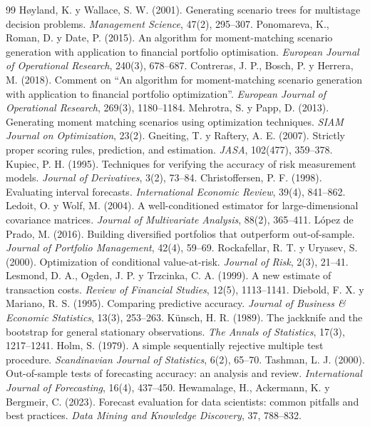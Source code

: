 \documentclass[11pt,letterpaper]{article}
\begin{document}
\small
\begin{thebibliography}{99}
 Høyland, K. y Wallace, S. W. (2001). Generating scenario trees for multistage decision problems. \textit{Management Science}, 47(2), 295--307.
 Ponomareva, K., Roman, D. y Date, P. (2015). An algorithm for moment-matching scenario generation with application to financial portfolio optimisation. \textit{European Journal of Operational Research}, 240(3), 678--687.
 Contreras, J. P., Bosch, P. y Herrera, M. (2018). Comment on ``An algorithm for moment-matching scenario generation with application to financial portfolio optimization''. \textit{European Journal of Operational Research}, 269(3), 1180--1184.
 Mehrotra, S. y Papp, D. (2013). Generating moment matching scenarios using optimization techniques. \textit{SIAM Journal on Optimization}, 23(2).
 Gneiting, T. y Raftery, A. E. (2007). Strictly proper scoring rules, prediction, and estimation. \textit{JASA}, 102(477), 359--378.
 Kupiec, P. H. (1995). Techniques for verifying the accuracy of risk measurement models. \textit{Journal of Derivatives}, 3(2), 73--84.
 Christoffersen, P. F. (1998). Evaluating interval forecasts. \textit{International Economic Review}, 39(4), 841--862.
 Ledoit, O. y Wolf, M. (2004). A well-conditioned estimator for large-dimensional covariance matrices. \textit{Journal of Multivariate Analysis}, 88(2), 365--411.
 López de Prado, M. (2016). Building diversified portfolios that outperform out-of-sample. \textit{Journal of Portfolio Management}, 42(4), 59--69.
 Rockafellar, R. T. y Uryasev, S. (2000). Optimization of conditional value-at-risk. \textit{Journal of Risk}, 2(3), 21--41.
 Lesmond, D. A., Ogden, J. P. y Trzcinka, C. A. (1999). A new estimate of transaction costs. \textit{Review of Financial Studies}, 12(5), 1113--1141.
 Diebold, F. X. y Mariano, R. S. (1995). Comparing predictive accuracy. \textit{Journal of Business \& Economic Statistics}, 13(3), 253--263.
 Künsch, H. R. (1989). The jackknife and the bootstrap for general stationary observations. \textit{The Annals of Statistics}, 17(3), 1217--1241.
 Holm, S. (1979). A simple sequentially rejective multiple test procedure. \textit{Scandinavian Journal of Statistics}, 6(2), 65--70.
 Tashman, L. J. (2000). Out-of-sample tests of forecasting accuracy: an analysis and review. \textit{International Journal of Forecasting}, 16(4), 437--450.
 Hewamalage, H., Ackermann, K. y Bergmeir, C. (2023). Forecast evaluation for data scientists: common pitfalls and best practices. \textit{Data Mining and Knowledge Discovery}, 37, 788--832.
\end{thebibliography}
\normalsize
\end{document}
